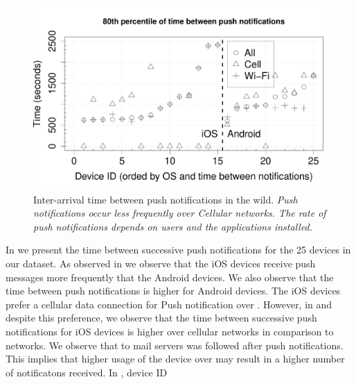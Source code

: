 \begin{figure}
\includegraphics[width=\columnwidth]{plots/push_inter_arrival_wild.pdf}
\caption{Inter-arrival time between push notifications in the wild. \emph{Push notifications occur less frequently over Cellular networks. The rate of push notifications depends on users and the applications installed. }}
\label{fig:wild-inter-arrival-push}
\end{figure}


In  we present the time between successive push notifications for the 25 devices in our dataset. 
As observed in  we observe that the iOS devices receive push messages more frequently that the Android devices. 
We also observe that the time between push notifications is higher for Android devices.
The iOS devices prefer a cellular data connection for Push notification over \wifi {}. 
However, in  and  despite this preference, we observe that the time between successive push notifications for iOS devices is higher over cellular networks in comparison to \wifi networks.  
We observe that  to mail servers was followed  after push notifications.
This implies that higher usage of the device over \wifi may result in a higher number of notificatons received. 
In , device ID 



